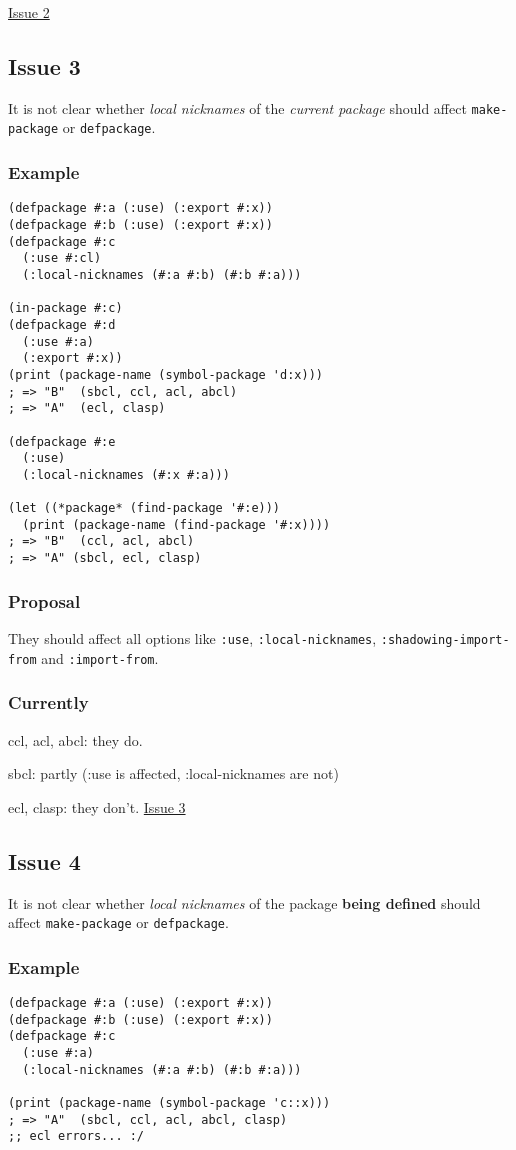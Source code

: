 \documentclass[11pt]{article}
\begin{document}
\href{./issues/2.org}{Issue 2}

\subsection{Issue 3}
\label{sec:org0854ac5}
It is not clear whether \emph{local nicknames} of the \emph{current package} should
affect \texttt{make-package} or \texttt{defpackage}.
\subsubsection{Example}
\label{sec:org8c36cca}
\begin{verbatim}
(defpackage #:a (:use) (:export #:x))
(defpackage #:b (:use) (:export #:x))
(defpackage #:c
  (:use #:cl)
  (:local-nicknames (#:a #:b) (#:b #:a)))

(in-package #:c)
(defpackage #:d
  (:use #:a)
  (:export #:x))
(print (package-name (symbol-package 'd:x)))
; => "B"  (sbcl, ccl, acl, abcl)
; => "A"  (ecl, clasp)

(defpackage #:e
  (:use)
  (:local-nicknames (#:x #:a)))

(let ((*package* (find-package '#:e)))
  (print (package-name (find-package '#:x))))
; => "B"  (ccl, acl, abcl)
; => "A" (sbcl, ecl, clasp)
\end{verbatim}
\subsubsection{Proposal}
\label{sec:org3f9b87c}
They should affect all options like \texttt{:use}, \texttt{:local-nicknames},
\texttt{:shadowing-import-from} and \texttt{:import-from}.
\subsubsection{Currently}
\label{sec:orgee5b174}
ccl, acl, abcl: they do.

sbcl: partly (:use is affected, :local-nicknames are not)

 ecl, clasp: they don't.
\href{./issues/3.org}{Issue 3}

\subsection{Issue 4}
\label{sec:org57c7ca4}
It is not clear whether \emph{local nicknames} of the package \textbf{being defined}
should affect \texttt{make-package} or \texttt{defpackage}.
\subsubsection{Example}
\label{sec:org05eb971}
\begin{verbatim}
(defpackage #:a (:use) (:export #:x))
(defpackage #:b (:use) (:export #:x))
(defpackage #:c
  (:use #:a)
  (:local-nicknames (#:a #:b) (#:b #:a)))

(print (package-name (symbol-package 'c::x)))
; => "A"  (sbcl, ccl, acl, abcl, clasp)
;; ecl errors... :/
\end{verbatim}
\end{document}
